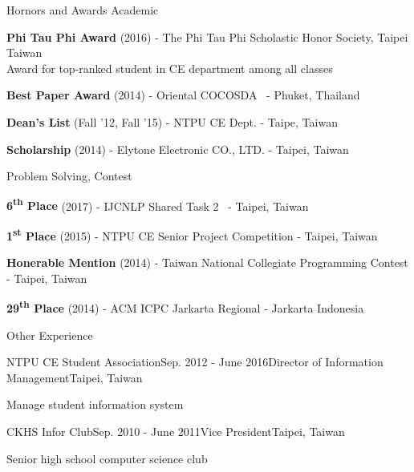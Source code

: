 \documentclass{resume} %
\newcommand{\ts}{\textsuperscript}
\begin{document}

\begin{rSection}{Hornors and Awards}
Academic
\begin{rSubsection}{}{}{}{}
\item {\bf Phi Tau Phi Award} (2016) - The Phi Tau Phi Scholastic Honor Society, Taipei Taiwan \\
Award for top-ranked student in CE department among all classes
\item {\bf Best Paper Award} (2014) - Oriental COCOSDA~\cite{hung2014investigation} - Phuket, Thailand
\item {\bf Dean's List} (Fall '12, Fall '15) - NTPU CE Dept. - Taipe, Taiwan
\item {\bf Scholarship} (2014) - Elytone Electronic CO., LTD. - Taipei, Taiwan
\end{rSubsection}

Problem Solving, Contest
\begin{rSubsection}{}{}{}{}
\item {\bf 6\ts{th} Place} (2017) - IJCNLP Shared Task 2~\cite{lee2017nctu} - Taipei, Taiwan
\item {\bf 1\ts{st} Place} (2015) - NTPU CE Senior Project Competition - Taipei, Taiwan
\item {\bf Honerable Mention} (2014) - Taiwan National Collegiate Programming Contest - Taipei, Taiwan
\item {\bf 29\ts{th} Place} (2014) - ACM ICPC Jarkarta Regional - Jarkarta Indonesia
\end{rSubsection}

\end{rSection}


\begin{rSection}{Other Experience}
\begin{rSubsection}{NTPU CE Student Association}{Sep. 2012 - June 2016}{Director of Information Management}{Taipei, Taiwan}
\item Manage student information system
\end{rSubsection}
\begin{rSubsection}{CKHS Infor Club}{Sep. 2010 - June 2011}{Vice President}{Taipei, Taiwan}
\item Senior high school computer science club
\end{rSubsection}
\end{rSection}
\end{document}
